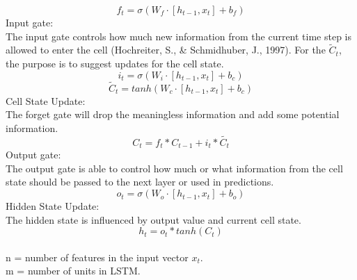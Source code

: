 \documentclass[12pt,a4paper]{article}
\begin{document}
\begin{equation}
    f_t = \sigma( W_f \cdot [ h_{t-1} , x_t ] + b_f ) 
\end{equation}
Input gate: 
\\[1ex]
The input gate controls how much new information from the current time step is allowed to enter the cell (Hochreiter, S., \& Schmidhuber, J., 1997). For the $\widetilde{C}_t$, the purpose is to suggest updates for the cell state. 
\begin{equation}
    i_t = \sigma( W_i \cdot [ h_{t-1} , x_t ] + b_c ) 
\end{equation}
\begin{equation}
    \widetilde{C}_t = tanh( W_c \cdot [ h_{t-1} , x_t ] + b_c )
\end{equation}
Cell State Update:
\\[1ex]
The forget gate will drop the meaningless information and add some potential information.
\begin{equation}
    C_t = f_t * C_{t-1} + i_t * \widetilde{C_t}
\end{equation}
Output gate:
\\[1ex]
The output gate is able to control how much or what information from the cell state should be passed to the next layer or used in predictions. 
\begin{equation}
    o_t = \sigma( W_o \cdot [ h_{t-1} , x_t ] + b_o )
\end{equation}
Hidden State Update:
\\[1ex]
The hidden state is influenced by output value and current cell state. 
\begin{equation}
    h_t = o_t * tanh(C_t)
\end{equation}
\\[1ex]
n = number of features in the input vector $x_t$.\\
m = number of units in LSTM.\\
\end{document}
